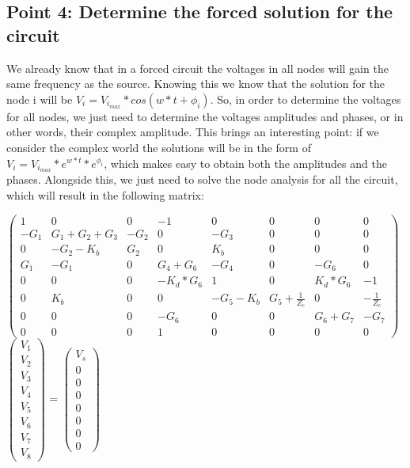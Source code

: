 \subsection{Point 4: Determine the forced solution for the circuit}

We already know that in a forced circuit the voltages in all nodes will gain the same frequency as the source. Knowing this we know that the solution for the node i will be $V_{i} = V_{i_{max}}*cos(w*t + \phi_{i})$. So, in order to determine the voltages for all nodes, we just need to determine the voltages amplitudes and phases, or in other words, their complex amplitude. This brings an interesting point: if we consider the complex world the solutions will be in the form of $V_{i} = V_{i_{max}}*e^{w*t} * e^{\phi_{i}}$, which makes easy to obtain both the amplitudes and the phases.
Alongside this, we just need to solve the node analysis for all the circuit, which will result in the following matrix:

\setlength{\parskip}{4em}

$\begin{pmatrix}
1 & 0 & 0 & -1 & 0 & 0 & 0 & 0\\
-G_1 & G_1+G_2+G_3 & -G_2 & 0 & -G_3 & 0 & 0 & 0\\
0 & -G_2-K_b & G_2 & 0 & K_b & 0 & 0 & 0 \\
G_1 & -G_1 & 0 & G_4+G_6 & -G_4 & 0 & -G_6 & 0\\
0 & 0 & 0 & -K_d*G_6 & 1 & 0 & K_d*G_6 & -1 \\
0 & K_b & 0 & 0 & -G_5-K_b & G_5+\frac{1}{Z_c} & 0 & -\frac{1}{Z_c} \\
0 & 0 & 0 & -G_6 & 0 & 0 & G_6+G_7 & -G_7  \\ 
0 & 0 & 0 & 1 & 0 & 0 & 0 & 0
\end{pmatrix}$
$\begin{pmatrix}
V_1\\
V_2\\
V_3\\
V_4\\
V_5\\
V_6\\
V_7\\
V_8
\end{pmatrix}$
=
$\begin{pmatrix}
V_s\\
0\\
0\\
0\\
0\\
0\\
0\\
0
\end{pmatrix}$

